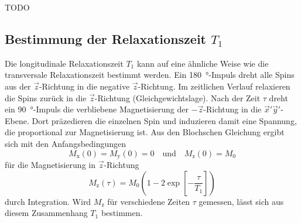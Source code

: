 TODO


\subsection{Bestimmung der Relaxationszeit $T_1$}
\label{sec:T1Theo}

Die longitudinale Relaxationszeit $T_1$ kann auf eine ähnliche Weise wie die
transversale Relaxationszeit bestimmt werden.
Ein \SI{180}{\degree}-Impuls dreht alle Spins aus der $\vec{z}$-Richtung in
die negative $\vec{z}$-Richtung. Im zeitlichen Verlauf relaxieren die Spins zurück
in die $\vec{z}$-Richtung (Gleichgewichtslage).
Nach der Zeit $\tau$ dreht ein \SI{90}{\degree}-Impuls die verbliebene Magnetisierung
der $-\vec{z}$-Richtung in die $\vec{x}'\vec{y}'$-Ebene.
Dort präzedieren die einzelnen Spin und induzieren damit eine Spannung, die
proportional zur Magnetisierung ist.
Aus den Blochschen Gleichung ergibt sich mit den Anfangsbedingungen
\begin{equation*}
  M_\text{x}\!\left(0\right) = M_\text{y}\!\left(0\right) = 0
  \quad \text{und} \quad M_\text{z}\!\left(0\right) = M_0
\end{equation*}
für die Magnetisierung in $\vec{z}$-Richtung
\begin{equation}
  M_\text{z}\!\left(\tau\right) =
  M_0 \left(1 - 2 \exp\!\left[-\frac{\tau}{T_1}\right]\right)
  \label{eqn:T1-Vermessung}
\end{equation}
durch Integration.
Wird $M_\text{z}$ für verschiedene Zeiten $\tau$ gemessen, lässt sich aus diesem
Zusammenhang $T_1$ bestimmen.

